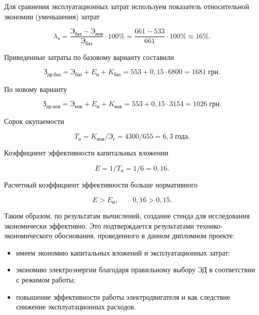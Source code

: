         Для сравнения эксплуатационных затрат используем показатель
        относительной экономии (уменьшения) затрат

        \begin{equation*}
            \lambda_\text{э} = 
                \frac{\text{Э}_\text{баз} - \text{Э}_\text{нов}}
                    {\text{Э}_\text{баз}} \cdot 100 \% = 
                        \frac{661-533}{661} \cdot 100 \% \approx 16 \%.
        \end{equation*}

        Приведенные затраты по базовому варианту составили

        \begin{equation*}
            \text{З}_\text{пр.баз} = 
                \text{Э}_\text{баз} + E_\text{н} + K_\text{баз} = 
                    553 + 0,15 \cdot 6800 = 1681 \; \text{грн}.
        \end{equation*}

        По новому варианту

        \begin{equation*}
            \text{З}_\text{пр.нов} = 
                \text{Э}_\text{нов} + E_\text{н} + K_\text{нов} = 
                    553 + 0,15 \cdot 3154 = 1026 \; \text{грн}.
        \end{equation*}

        Сорок окупаемости

        \begin{equation*}
            T_\text{о} = K_\text{нов} / \text{Э}_\text{г} = 
                4300 / 655 = 6,3 \; \text{года}.
        \end{equation*}

        Коэффициент эффективности капитальных вложении

        \begin{equation*}
            E = 1 / T_\text{о} = 1 / 6 = 0,16.
        \end{equation*}

       Расчетный коэффициент эффективности больше нормативного 

        \begin{equation*}
            E > E_\text{н},\qquad 0,16 > 0,15. 
        \end{equation*}

        Таким образом, по результатам вычислений, создание стенда для
        исследования экономически эффективно. Это подтверждается результатами
        технико-экономического обоснования, проведенного в данном дипломном
        проекте:
        \begin{itemize}
            \item имеем экономию капитальных вложений и эксплуатационных
                затрат;
            \item экономию электроэнергии благодаря правильному выбору ЭД в
                соответствии с режимом работы;
            \item повышение эффективности работы электродвигателя и как
                следствие снижение эксплуатационных расходов.
        \end{itemize}
